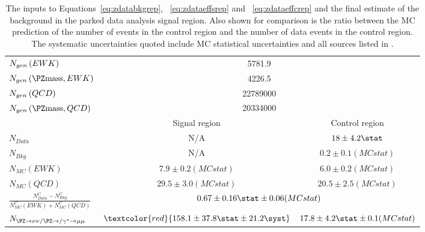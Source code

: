 \begin{table}
  \caption{The inputs to Equations~\ref{eq:zdatabkgrep}, ~\ref{eq:zdataeffsrep} and ~\ref{eq:zdataeffcrep} and the final estimate of the \Znunu background in the parked data analysis signal region. Also shown for comparison is the ratio between the \ac{MC} prediction of the number of \Zmumu events in the control region and the number of data events in the control region. The systematic uncertainties quoted include MC statistical uncertainties and all sources listed in . }
  \label{tab:parkedznunu}
  \begin{tabular}{lcc}
    \hline
    \hline
    $N_{gen}\left(\mathnormal{EWK}\right)$&\multicolumn{2}{c}{5781.9}\\
    $N_{gen}\left(\PZ\rm{mass},\mathnormal{EWK}\right)$&\multicolumn{2}{c}{4226.5}\\
    $N_{gen}\left(\mathnormal{QCD}\right)$&\multicolumn{2}{c}{22789000}\\
    $N_{gen}\left(\PZ\rm{mass},\mathnormal{QCD}\right)$&\multicolumn{2}{c}{20334000}\\
    \hline
    \hline
    & Signal region & Control region \\
    \hline
    \hline
    $N_{Data}$ & N/A & $18\pm 4.2\stat$ \\
    $N_{Bkg}$ & N/A & $0.2\pm 0.1 (MC stat)$ \\
    $N_{MC}\left(EWK\right)$ & $7.9\pm 0.2 (MC stat)$& $6.0\pm 0.2 (MC stat)$ \\
    $N_{MC}\left(QCD\right)$ & $29.5\pm 3.0 (MC stat)$ & $20.5\pm 2.5 (MC stat)$ \\
    \hline
    $\frac{N^{C}_{Data}-N^{C}_{Bkg}}{N^{C}_{MC}\left(EWK\right)+N^{C}_{MC}\left(QCD\right)}$ & \multicolumn{2}{c}{$0.67\pm 0.16\stat\pm 0.06 (MC stat)$} \\
    \hline
    $N_{\PZ\rightarrow \nu\nu/\PZ\rightarrow/\gamma^{*}\rightarrow\mu\mu}$ & $\textcolor{red}{158.1\pm 37.8\stat\pm 21.2\syst}$ & $17.8\pm 4.2\stat\pm 0.1 (MC stat)$ \\
    \hline
    \hline
  \end{tabular}
\end{table}

